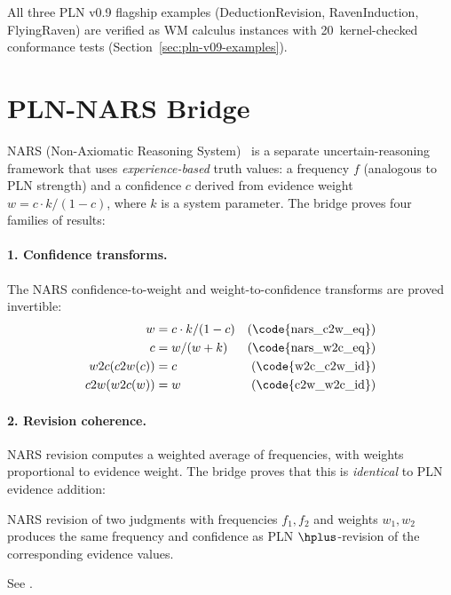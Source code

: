 \documentclass[11pt,openany]{report}
\begin{document}
\noindent
All three PLN v0.9 flagship examples (DeductionRevision,
RavenInduction, FlyingRaven) are verified as WM calculus instances
with 20~kernel-checked conformance tests
(Section~\ref{sec:pln-v09-examples}).

\section{PLN-NARS Bridge}
\label{sec:pln-nars-bridge}

NARS (Non-Axiomatic Reasoning System)~\cite{Wang2006NARS} is a
separate uncertain-reasoning framework that uses \emph{experience-based}
truth values: a frequency $f$ (analogous to PLN strength) and a
confidence $c$ derived from evidence weight $w = c \cdot k / (1 - c)$,
where $k$ is a system parameter.  The bridge proves four families of
results:

\paragraph{1. Confidence transforms.}
The NARS confidence-to-weight and weight-to-confidence transforms
are proved invertible:
\begin{align}
  w &= c \cdot k / (1 - c) & \text{(\code{nars\_c2w\_eq})} \\
  c &= w / (w + k) & \text{(\code{nars\_w2c\_eq})} \\
  w2c(c2w(c)) &= c & \text{(\code{w2c\_c2w\_id})} \\
  c2w(w2c(w)) &= w & \text{(\code{c2w\_w2c\_id})}
\end{align}

\paragraph{2. Revision coherence.}
NARS revision computes a weighted average of frequencies, with
weights proportional to evidence weight.  The bridge proves that
this is \emph{identical} to PLN evidence addition:

\begin{theorem}[NARS revision = PLN evidence algebra (\claimCore{})]
NARS revision of two judgments with frequencies $f_1, f_2$ and
weights $w_1, w_2$ produces the same frequency and confidence as
PLN $\hplus$-revision of the corresponding evidence values.
\end{theorem}

\noindent
See .
\end{document}
